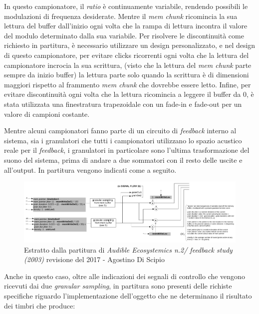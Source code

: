 In questo campionatore, il \textit{ratio} è continuamente variabile, 
rendendo possibili le modulazioni di frequenza desiderate. 
Mentre il \textit{mem chunk} ricomincia la sua lettura del buffer dall'inizio 
ogni volta che la rampa di lettura incontra il valore del modulo determinato dalla sua variabile.
Per risolvere le discontinuità come richiesto in partitura, 
è necessario utilizzare un design personalizzato,
e nel design di questo campionatore, 
per evitare clicks ricorrenti ogni volta che la lettura del campionatore incrocia la sua scrittura, 
(visto che la lettura del \textit{mem chunk} parte sempre da inizio buffer)
la lettura parte solo quando la scrittura è di dimensioni maggiori rispetto al frammento \textit{mem chunk} 
che dovrebbe essere letto.
Infine, per evitare discontinuità ogni volta che la lettura ricomincia a leggere il buffer da 0, 
è stata utilizzata una finestratura trapezoidale con un fade-in e fade-out 
per un valore di campioni costante. 

Mentre alcuni campionatori fanno parte di un circuito di \emph{feedback} interno al sistema, 
sia i granulatori che tutti i campionatori utilizzano lo spazio acustico reale per il \emph{feedback},
i granulatori in particolare sono l'ultima trasformazione del suono del sistema, prima di andare a 
due sommatori con il resto delle uscite e all'output.
In partitura vengono indicati come a seguito. 

\begin{figure}[h!]
\begin{center}
    \includegraphics[width=14cm]{figures/GRANULATORSFeedbackstudy2017.pdf}
    \caption{Estratto dalla partitura di \textit{Audible Ecosystemics n.2/ feedback study (2003)}
    revisione del 2017 - Agostino Di Scipio}
    \vspace{0.5cm}
\end{center}
\end{figure}

Anche in questo caso, oltre alle indicazioni dei segnali di controllo che vengono
ricevuti dai due \textit{granular sampling}, 
in partitura sono presenti delle richiste specifiche riguardo l'implementazione 
dell'oggetto che ne determinano il risultato dei timbri che produce: 

